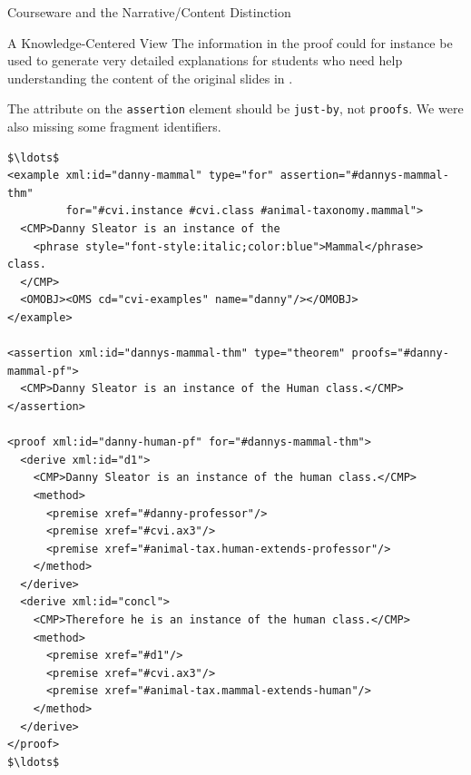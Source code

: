 \begin{tchapter}[id=courseware]{Courseware and the Narrative/Content Distinction}
\begin{tsection}[id=knowledge-centered]{A Knowledge-Centered View}
The information in the proof could for instance be used to generate very detailed
explanations for students who need help understanding the content of the original
slides in {}.

\begin{erratum}[date=2006-09-01,reported-by=Michael Kohlhase]
  {The attribute on the {\tt{assertion}} element should be {\tt{just-by}}, not
  {\tt{proofs}}. We were also missing some fragment identifiers.}
\begin{lstlisting}[label=lst:var-cvi-ex,mathescape,
    caption={An Alternative Representation Using {\element{example}} Elements},
    index={example,proof,assertion,derive,premise}]
$\ldots$
<example xml:id="danny-mammal" type="for" assertion="#dannys-mammal-thm"
         for="#cvi.instance #cvi.class #animal-taxonomy.mammal">
  <CMP>Danny Sleator is an instance of the 
    <phrase style="font-style:italic;color:blue">Mammal</phrase> class. 
  </CMP>
  <OMOBJ><OMS cd="cvi-examples" name="danny"/></OMOBJ>
</example>

<assertion xml:id="dannys-mammal-thm" type="theorem" proofs="#danny-mammal-pf">
  <CMP>Danny Sleator is an instance of the Human class.</CMP>
</assertion>

<proof xml:id="danny-human-pf" for="#dannys-mammal-thm">
  <derive xml:id="d1">
    <CMP>Danny Sleator is an instance of the human class.</CMP>
    <method>
      <premise xref="#danny-professor"/>
      <premise xref="#cvi.ax3"/>
      <premise xref="#animal-tax.human-extends-professor"/>
    </method>
  </derive>
  <derive xml:id="concl">
    <CMP>Therefore he is an instance of the human class.</CMP>
    <method>
      <premise xref="#d1"/>
      <premise xref="#cvi.ax3"/>
      <premise xref="#animal-tax.mammal-extends-human"/>
    </method>
  </derive>
</proof>
$\ldots$
\end{lstlisting}
\end{erratum}


\end{tsection}
\end{tchapter}
